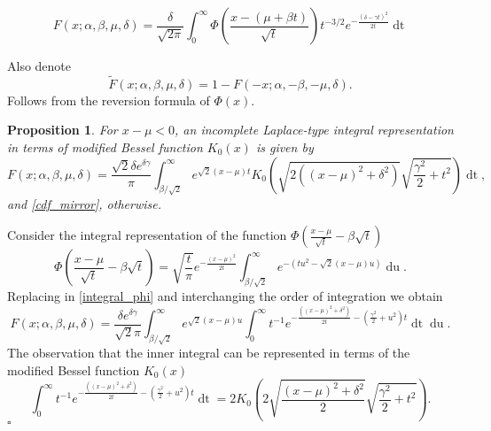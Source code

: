 \documentclass[10pt,a4paper,oneside]{article}
\newtheorem{proposition}[theorem]{Proposition}
\newenvironment{proof}{\noindent{\bf Proof:}}{\hfill$\square$}
\numberwithin{equation}{section}
\begin{document}
\begin{equation}\label{integral_phi}
F(x; \alpha, \beta, \mu, \delta) = \frac{\delta}{\sqrt{2\pi}}\int_{0}^{\infty} \Phi\left(\frac{x - (\mu +\beta t)}{\sqrt{t}}\right) t^{-3/2} e^{-\frac{(\delta - \gamma t)^2}{2t}} \mathop{dt}
\end{equation}

Also denote
\begin{equation}\label{cdf_mirror}
\tilde{F}(x; \alpha, \beta, \mu, \delta) = 1- F(-x; \alpha, -\beta, -\mu, \delta).
\end{equation}
Follows from the reversion formula of $\Phi(x)$.

\begin{proposition} For $x - \mu < 0$, an incomplete Laplace-type integral representation in terms of modified Bessel function $K_0(x)$ is given by
\begin{equation}\label{integral_k0}
F(x; \alpha, \beta, \mu, \delta) = \frac{\sqrt{2}\delta e^{\delta \gamma}}{\pi}\int_{\beta / \sqrt{2}}^{\infty} e^{\sqrt{2}(x-\mu)t} K_0\left(\sqrt{2\left( (x-\mu)^2 + \delta^2\right)} \sqrt{\frac{\gamma^2}{2} + t^2}\right) \mathop{dt},
\end{equation}
and \eqref{cdf_mirror}, otherwise.
\end{proposition}
\begin{proof}
Consider the integral representation of the function $\Phi\left(\frac{x-\mu}{\sqrt{t}} -\beta \sqrt{t} \right)$
\begin{equation*}
\Phi\left(\frac{x-\mu}{\sqrt{t}} -\beta \sqrt{t} \right) = \sqrt{\frac{t}{\pi}} e^{-\frac{(x-\mu)^2}{2t}}\int_{\beta/\sqrt{2}}^{\infty} e^{-(tu^2 - \sqrt{2}(x-\mu) u)} \mathop{du}.
\end{equation*}
Replacing in \eqref{integral_phi} and interchanging the order of integration we obtain
\begin{equation*}
F(x; \alpha, \beta, \mu, \delta) = \frac{\delta e^{\delta \gamma}}{\sqrt{2}\pi} \int_{\beta/\sqrt{2}}^{\infty} e^{\sqrt{2}(x-\mu) u} \int_{0}^{\infty} t^{-1} e^{-\frac{\left((x-\mu)^2 + \delta^2\right)}{2t} - \left(\frac{\gamma^2}{2} + u^2\right)t} \mathop{dt} \mathop{du}.
\end{equation*}
The observation that the inner integral can be represented in terms of the modified Bessel function $K_0(x)$
\begin{equation*}
\int_{0}^{\infty} t^{-1} e^{-\frac{\left((x-\mu)^2 + \delta^2\right)}{2t} - \left(\frac{\gamma^2}{2} + u^2\right)t} \mathop{dt} = 2 K_0\left(2\sqrt{\frac{(x-\mu)^2 + \delta^2}{2}} \sqrt{\frac{\gamma^2}{2} + t^2}\right).
\end{equation*}
\end{proof}
\end{document}

